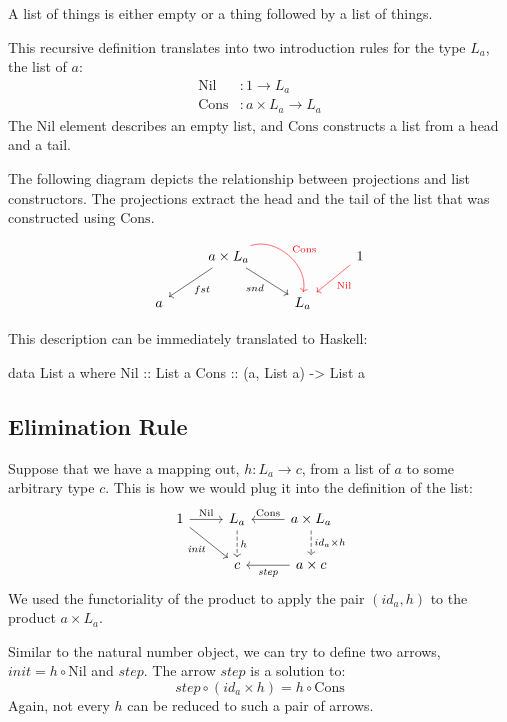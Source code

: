 \documentclass[DaoFP]{subfiles}
\begin{document}
A list of things is either empty or a thing followed by a list of things. 

This recursive definition translates into two introduction rules for the type $L_a$, the list of $a$: 
\begin{align*}
 \text{Nil} &\colon 1 \to L_a \\
 \text{Cons} &\colon a \times L_a \to L_a 
\end{align*}
The $\text{Nil}$ element describes an empty list, and $\text{Cons}$ constructs a list from a head and a tail. 

The following diagram depicts the relationship between projections and list constructors. The projections extract the head and the tail of the list that was constructed using $\text{Cons}$.
\[
 \begin{tikzcd}
 & a \times L_a
 \arrow[ld, "fst"]
 \arrow[rd,  "snd"']
 \arrow[rd, bend left=60, red, "\text{Cons}"]
 && 1
 \arrow[ld, red, "\text{Nil}"]
 \\
 a
&&L_a
  \end{tikzcd}
\]

This description can be immediately translated to Haskell:
\begin{haskell}
data List a where
  Nil  :: List a
  Cons :: (a, List a) -> List a
\end{haskell}



\subsection{Elimination Rule}

Suppose that we have a mapping out, $h \colon L_a \to c$, from a list of $a$ to some arbitrary type $c$. This is how we would plug it into the definition of the list:
\[
 \begin{tikzcd}
 1
 \arrow[r, "\text{Nil}"]
 \arrow[rd, "\mathit{init}"']
 &L_a
\arrow[d, dashed, "h"]
&a \times L_a
  \arrow[l, "\text{Cons}"']
\arrow[d, dashed, "id_a \times h"]
\\
& c
& a \times c
\arrow[l, "\mathit{step}"]
  \end{tikzcd}
\]
We used the functoriality of the product to apply the pair $(id_a, h)$ to the product $a \times L_a$.

Similar to the natural number object, we can try to define two arrows, $\mathit{init} = h \circ \text{Nil}$ and $\mathit{step}$. The arrow $\mathit{step}$ is a solution to:
\[ \mathit{step} \circ (id_a \times h) = h \circ \text{Cons} \]
Again, not every $h$ can be reduced to such a pair of arrows.
\end{document}
